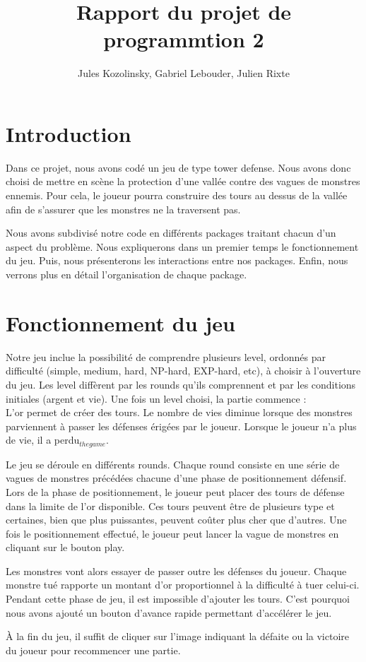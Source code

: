 \documentclass{article}
\title{Rapport du projet de programmtion 2}
\author{Jules Kozolinsky, Gabriel Lebouder, Julien Rixte}
\begin{document}
\maketitle

\section{Introduction}
Dans ce projet, nous avons codé un jeu de type tower defense. Nous avons donc choisi de mettre en scène la protection d'une vallée contre des vagues de monstres ennemis. Pour cela, le joueur pourra construire des tours au dessus de la vallée afin de s'assurer que les monstres ne la traversent pas. 
\par
Nous avons subdivisé notre code en différents packages traitant chacun d'un aspect du problème. Nous expliquerons dans un premier temps le fonctionnement du jeu. Puis, nous présenterons les interactions entre nos packages. Enfin, nous verrons plus en détail l'organisation de chaque package.

\section{Fonctionnement du jeu}
Notre jeu inclue la possibilité de comprendre plusieurs level, ordonnés par difficulté (simple, medium, hard, NP-hard, EXP-hard, etc), à choisir à l'ouverture du jeu. Les level diffèrent par les rounds qu'ils comprennent et par les conditions initiales (argent et vie).
Une fois un level choisi, la partie commence :\\
L'or permet de créer des tours. Le nombre de vies diminue lorsque des monstres parviennent à passer les défenses érigées par le joueur. Lorsque le joueur n'a plus de vie, il a perdu$_{the game}$.
\par
Le jeu se déroule en différents rounds. Chaque round consiste en une série de vagues de monstres précédées chacune d'une phase de positionnement défensif. Lors de la phase de positionnement, le joueur peut placer des tours de défense dans la limite de l'or disponible. Ces tours peuvent être de plusieurs type et certaines, bien que plus puissantes, peuvent coûter plus cher que d'autres. Une fois le positionnement effectué, le joueur peut lancer la vague de monstres en cliquant sur le bouton play.
\par
Les monstres vont alors essayer de passer outre les défenses du joueur. Chaque monstre tué rapporte un montant d'or proportionnel à la difficulté à tuer celui-ci. Pendant cette phase de jeu, il est impossible d'ajouter les tours. C'est pourquoi nous avons ajouté un bouton d'avance rapide permettant d'accélérer le jeu.
\par
À la fin du jeu, il suffit de cliquer sur l'image indiquant la défaite ou la victoire du joueur pour recommencer une partie.
\end{document}
